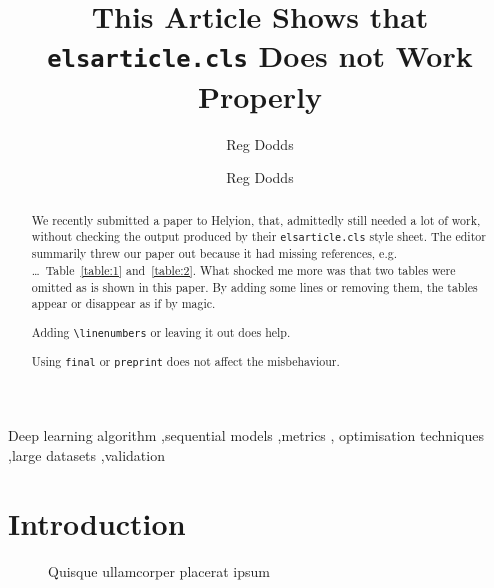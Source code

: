 \documentclass[preprint,3p,times,twocolumn]{elsarticle}  %
\begin{document}
\begin{frontmatter}
\title{This Article Shows that \texttt{elsarticle.cls} Does not Work Properly}
\ifpeerreview
\author{Reg Dodds}
\address{Department of Computer Science, University of the Western Cape, South Africa}
\else
\author{Reg Dodds}
\address{Department of Computer Science, University of the Western Cape, South Africa}
\fi
{}

\begin{abstract}
We recently submitted a paper to Helyion, that, admittedly still needed 
a lot of work, without checking the output produced by their \texttt{elsarticle.cls}
style sheet.  The editor summarily threw our paper out because it had missing 
references, e.g. \ldots\ Table~\ref{table:1} and~\ref{table:2}.  What shocked me
more was that two tables were omitted as is shown in this paper.  By adding some 
lines or removing them, the tables appear or disappear as if by magic.

Adding \verb!\linenumbers! or leaving it out does help.

Using \verb!final! or \verb!preprint! does not affect the misbehaviour.

\lipsum[1]
\end{abstract}
\begin{keyword}
Deep learning algorithm \sep sequential models \sep metrics \sep
optimisation techniques \sep large datasets \sep validation
\end{keyword}
\end{frontmatter}
\linenumbers
\section{Introduction}\label{sec:intro}
\begin{figure}%
%
\centering
{}
\caption{Quisque ullamcorper placerat ipsum}\label{fig:1}
\end{figure}
\lipsum[3-5]
\end{document}
